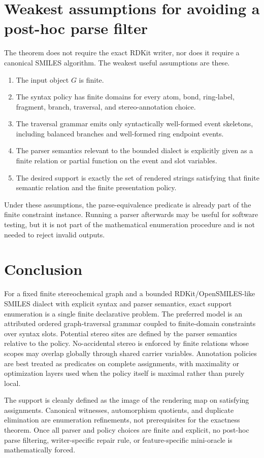 \documentclass[10pt,a4paper]{article}
\theoremstyle{definition}
\theoremstyle{remark}
\begin{document}
	\section{Weakest assumptions for avoiding a post-hoc parse filter}
	\label{s:weakest-assumptions}

	The theorem does not require the exact RDKit writer, nor does it require a
	canonical SMILES algorithm.  The weakest useful assumptions are these.
	\begin{enumerate}[label=\textup{(A\arabic*)},leftmargin=2.5em]
		\item The input object \(G\) is finite.
		\item The syntax policy has finite domains for every atom, bond, ring-label,
		fragment, branch, traversal, and stereo-annotation choice.
		\item The traversal grammar emits only syntactically well-formed event skeletons,
		including balanced branches and well-formed ring endpoint events.
		\item The parser semantics relevant to the bounded dialect is explicitly given
		as a finite relation or partial function on the event and slot variables.
		\item The desired support is exactly the set of rendered strings satisfying that
		finite semantic relation and the finite presentation policy.
	\end{enumerate}
	Under these assumptions, the parse-equivalence predicate is already part of the
	finite constraint instance.  Running a parser afterwards may be useful for
	software testing, but it is not part of the mathematical enumeration procedure
	and is not needed to reject invalid outputs.

	\section{Conclusion}
	\label{s:conclusion}

	For a fixed finite stereochemical graph and a bounded RDKit/OpenSMILES-like
	SMILES dialect with explicit syntax and parser semantics, exact support
	enumeration is a single finite declarative problem.  The preferred model is an
	attributed ordered graph-traversal grammar coupled to finite-domain constraints
	over syntax slots.  Potential stereo sites are defined by the parser semantics
	relative to the policy.  No-accidental stereo is enforced by finite relations
	whose scopes may overlap globally through shared carrier variables.  Annotation
	policies are best treated as predicates on complete assignments, with
	maximality or optimization layers used when the policy itself is maximal rather
	than purely local.

	The support is cleanly defined as the image of the rendering map on satisfying
	assignments.  Canonical witnesses, automorphism quotients, and duplicate
	elimination are enumeration refinements, not prerequisites for the exactness
	theorem.  Once all parser and policy choices are finite and explicit, no
	post-hoc parse filtering, writer-specific repair rule, or feature-specific
	mini-oracle is mathematically forced.
\end{document}
